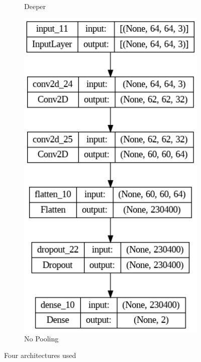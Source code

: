 \documentclass{thesisreport}
\begin{document}
\begin{figure}[h]
\begin{subfigure}[b]{0.2\linewidth}
    \caption{Deeper}
  \end{subfigure}
  \begin{subfigure}[b]{0.2\linewidth}
    \includegraphics[width=\linewidth]{figures/model_No_pooling.png}
    \caption{No Pooling}
  \end{subfigure}
  \caption{Four architectures used }
  \label{fig:four_images}
\end{figure}
\end{document}

